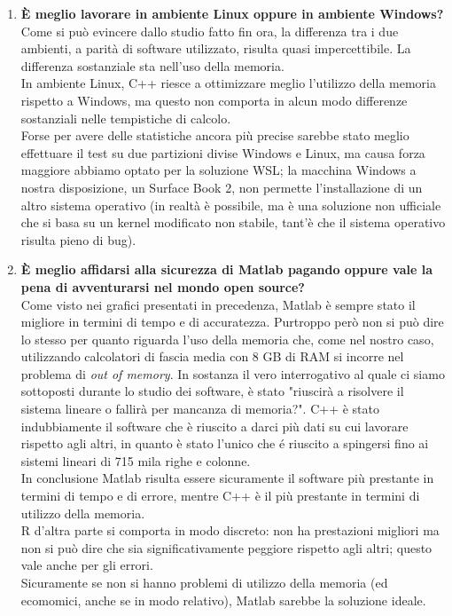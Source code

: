 \documentclass[preprint,12pt]{elsarticle}
\begin{document}
\begin{enumerate}
\item \textbf{\`E meglio lavorare in ambiente Linux oppure in ambiente Windows?}\\
Come si può evincere dallo studio fatto fin ora, la differenza tra i due ambienti, a parità di software utilizzato, risulta quasi impercettibile. La differenza sostanziale sta nell'uso della memoria.\\
In ambiente Linux, C++ riesce a ottimizzare meglio l'utilizzo della memoria rispetto a Windows, ma questo non comporta in alcun modo differenze sostanziali nelle tempistiche di calcolo.\\
Forse per avere delle statistiche ancora più precise sarebbe stato meglio effettuare il test su due partizioni divise Windows e Linux, ma causa forza maggiore abbiamo optato per la soluzione WSL; la macchina Windows a nostra disposizione, un Surface Book 2, non permette l'installazione di un altro sistema operativo (in realtà è possibile, ma è una soluzione non ufficiale che si basa su un kernel modificato non stabile, tant'è che il sistema operativo risulta pieno di bug).

\item \textbf{\`E meglio affidarsi alla sicurezza di Matlab pagando oppure vale la pena
di avventurarsi nel mondo open source?}\\
Come visto nei grafici presentati in precedenza, Matlab è sempre stato il migliore in termini di tempo e di accuratezza. Purtroppo però non si può dire lo stesso per quanto riguarda l'uso della memoria che, come nel nostro caso, utilizzando calcolatori di fascia media con 8 GB di RAM si incorre nel problema di \textit{out of memory}. In sostanza il vero interrogativo al quale ci siamo sottoposti durante lo studio dei software, è stato "riuscirà a risolvere il sistema lineare o fallirà per mancanza di memoria?". C++ è stato indubbiamente il software che è riuscito a darci più dati su cui lavorare rispetto agli altri, in quanto è stato l'unico che é riuscito a spingersi fino ai sistemi lineari di 715 mila righe e colonne.\\
In conclusione Matlab risulta essere sicuramente il software più prestante in termini di tempo e di errore, mentre C++ è il più prestante in termini di utilizzo della memoria.\\
R d'altra parte si comporta in modo discreto: non ha prestazioni migliori ma non si può dire che sia significativamente peggiore rispetto agli altri; questo vale anche per gli errori.\\
Sicuramente se non si hanno problemi di utilizzo della memoria (ed ecomomici, anche se in modo relativo), Matlab sarebbe la soluzione ideale.
\end{enumerate}
 
\end{document}
